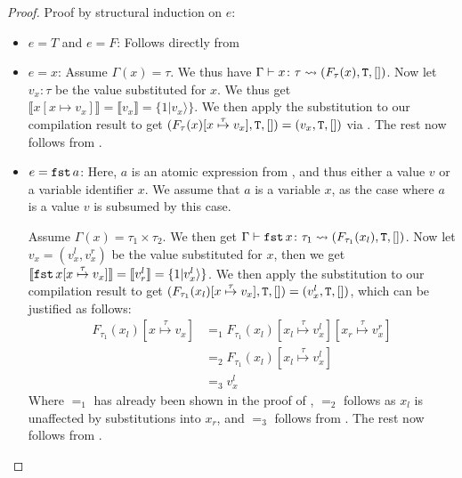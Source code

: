 \begin{proof}
	Proof by structural induction on $e$:
	\begin{itemize}
		\item $e = T$ and $e = F$: Follows directly from \\
		
		\item $e = x$: Assume $\Gamma(x) = \tau$.
		We thus have $\Gamma \vdash x \colon \tau \leadsto (F_\tau(x), \texttt{T}, [])$.
		Now let $v_x\colon \tau$ be the value substituted for $x$. 
		We thus get $\llbracket x[x \mapsto v_x] \rrbracket = \llbracket v_x \rrbracket = \{1|v_x\rangle\}$. 
		We then apply the substitution to our compilation result to get $(F_\tau(x) [x \overset{\tau}{\mapsto} v_x], \texttt{T}, []) = (v_x, \texttt{T}, [])$ via .
		The rest now follows from .\\
		
		\item $e = \texttt{fst}\, a$: Here, $a$ is an atomic expression from \AEXP, and thus either a value $v$ or a variable identifier $x$. 
		We assume that $a$ is a variable $x$, as the case where $a$ is a value $v$ is subsumed by this case. 
		
		Assume $\Gamma(x) = \tau_1 \times \tau_2$. 
		We then get $\Gamma \vdash \texttt{fst}\, x \colon \tau_1 \leadsto (F_{\tau_1}(x_l), \texttt{T}, [])$.
		Now let $v_x = (v^l_x, v^r_x)$ be the value substituted for $x$, then we get $\llbracket \texttt{fst}\, x[x \overset{\tau}{\mapsto} v_x] \rrbracket = \llbracket v^l_r\rrbracket = \{1|v^l_x\rangle\}$.
		We then apply the substitution to our compilation result to get $(F_{\tau_1}(x_l)[x \overset{\tau}{\mapsto} v_x], \texttt{T}, []) = (v^l_x, \texttt{T}, [])$, which can be justified as follows: 
		\begin{align*}
			F_{\tau_1}(x_l)[x \overset{\tau}{\mapsto} v_x] 
			&=_1 F_{\tau_1}(x_l)[x_l \overset{\tau}{\mapsto} v^l_x][x_r \overset{\tau}{\mapsto} v^r_x] \\
			&=_2 F_{\tau_1}(x_l)[x_l \overset{\tau}{\mapsto} v^l_x] \\
			&=_3 v^l_x
		\end{align*}
		Where $=_1$ has already been shown in the proof of , $=_2$ follows as $x_l$ is unaffected by substitutions into $x_r$, and $=_3$ follows from  .
		The rest now follows from .\\
		

\end{itemize}
\end{proof}
